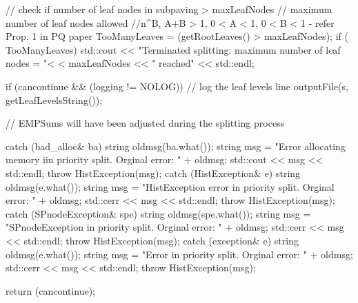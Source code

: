 \begin{DoxyCode}
{{{        
        // check if number of leaf nodes in subpaving > maxLeafNodes
        // maximum number of leaf nodes allowed
        //n^B, A+B > 1, 0  < A < 1, 0 < B < 1 - refer Prop. 1 in PQ paper
        TooManyLeaves = (getRootLeaves() > maxLeafNodes);
        if ( TooManyLeaves) {
          std::cout << "Terminated splitting: maximum number of leaf nodes = "<
      < maxLeafNodes << " reached"
                          << std::endl;
        }
      
      }
          

          
          if (cancontinue && (logging != NOLOG)) {
            // log the leaf levels line
            outputFile(s, getLeafLevelsString());
          }

          // EMPSums will have been adjusted during the splitting process
   }

    catch (bad_alloc& ba) {
        string oldmsg(ba.what());
        string msg = "Error allocating memory iin priority split.  Orginal
       error: "
                                    + oldmsg;
        std::cout << msg << std::endl;
        throw HistException(msg);
    }
    catch (HistException& e) {
        string oldmsg(e.what());
        string msg = "HistException error in priority split.  Orginal error: "
                                    + oldmsg;
        std::cerr << msg << std::endl;
        throw HistException(msg);
    }
    catch (SPnodeException& spe) {
        string oldmsg(spe.what());
        string msg = "SPnodeException in priority split.  Orginal error: "
                                    + oldmsg;
        std::cerr << msg << std::endl;
        throw HistException(msg);
    }
    catch (exception& e) {
        string oldmsg(e.what());
        string msg = "Error in priority split.  Orginal error: " + oldmsg;
        std::cerr << msg << std::endl;
        throw HistException(msg);
    }

    return (cancontinue);
}
\end{DoxyCode}
